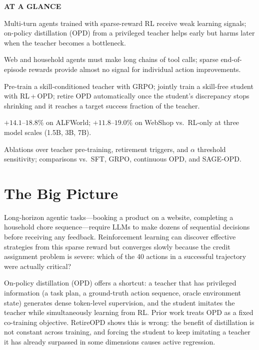 \documentclass[10pt,twocolumn]{article}
\begin{document}
\begin{mdframed}[backgroundcolor=boxgray,linecolor=rulered,linewidth=1pt,
    innerleftmargin=6pt,innerrightmargin=6pt,
    innertopmargin=6pt,innerbottommargin=6pt]
\textbf{\small AT A GLANCE}\par\vspace{4pt}
\begin{description}[leftmargin=0pt,labelsep=4pt,itemsep=2pt,parsep=0pt,
    font=\small\bfseries]
  \item[Problem:] Multi-turn agents trained with sparse-reward RL receive
    weak learning signals; on-policy distillation (OPD) from a privileged
    teacher helps early but harms later when the teacher becomes a bottleneck.
  \item[Why it matters:] Web and household agents must make long chains of
    tool calls; sparse end-of-episode rewards provide almost no signal for
    individual action improvements.
  \item[Method:] Pre-train a skill-conditioned teacher with GRPO; jointly
    train a skill-free student with RL\,+\,OPD; retire OPD automatically
    once the student's discrepancy stops shrinking and it reaches a target
    success fraction of the teacher.
  \item[Result:] $+14.1$--$18.8\%$ on ALFWorld; $+11.8$--$19.0\%$ on
    WebShop vs.\ RL-only at three model scales (1.5B, 3B, 7B).
  \item[Evidence:] Ablations over teacher pre-training, retirement
    triggers, and $\alpha$ threshold sensitivity; comparisons vs.\
    SFT, GRPO, continuous OPD, and SAGE-OPD.
\end{description}
\end{mdframed}

\section{The Big Picture}

Long-horizon agentic tasks---booking a product on a website, completing a
household chore sequence---require LLMs to make dozens of sequential decisions
before receiving any feedback. Reinforcement learning can discover effective
strategies from this sparse reward but converges slowly because the credit
assignment problem is severe: which of the 40 actions in a successful
trajectory were actually critical?

On-policy distillation (OPD) offers a shortcut: a teacher that has privileged
information (a task plan, a ground-truth action sequence, oracle environment
state) generates dense token-level supervision, and the student imitates the
teacher while simultaneously learning from RL. Prior work treats OPD as a
fixed co-training objective. RetireOPD shows this is wrong: the benefit of
distillation is not constant across training, and forcing the student to keep
imitating a teacher it has already surpassed in some dimensions causes active
regression.
\end{document}
